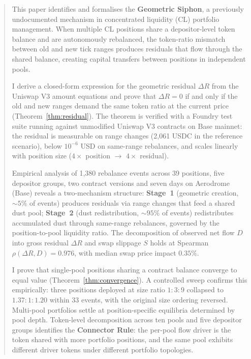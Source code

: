 \documentclass[11pt,a4paper]{article}
\begin{document}
\begin{abstract}
This paper identifies and formalises the \textbf{Geometric Siphon}, a previously undocumented mechanism in concentrated liquidity (CL) portfolio management. When multiple CL positions share a depositor-level token balance and are autonomously rebalanced, the token-ratio mismatch between old and new tick ranges produces residuals that flow through the shared balance, creating capital transfers between positions in independent pools.

I derive a closed-form expression for the geometric residual $\Delta R$ from the Uniswap V3 amount equations and prove that $\Delta R = 0$ if and only if the old and new ranges demand the same token ratio at the current price (Theorem~\ref{thm:residual}). The theorem is verified with a Foundry test suite running against unmodified Uniswap V3 contracts on Base mainnet: the residual is measurable on range changes (2{,}061 USDC in the reference scenario), below $10^{-6}$ USD on same-range rebalances, and scales linearly with position size ($4\times$ position $\to$ $4\times$ residual).

Empirical analysis of 1{,}380 rebalance events across 39 positions, five depositor groups, two contract versions and seven days on Aerodrome (Base) reveals a two-mechanism structure: \textbf{Stage~1} (geometric creation, ${\sim}5\%$ of events) produces residuals via range changes that feed a shared dust pool; \textbf{Stage~2} (dust redistribution, ${\sim}95\%$ of events) redistributes accumulated dust through same-range rebalances, governed by the position-to-pool liquidity ratio. The decomposition of observed net flow $D$ into gross residual $\Delta R$ and swap slippage $S$ holds at Spearman $\rho(\Delta R, D) = 0.976$, with median swap price impact $0.35\%$.

I prove that single-pool positions sharing a contract balance converge to equal value (Theorem~\ref{thm:convergence}). A controlled sweep confirms this empirically: three positions deployed at size ratio $1{:}3{:}9$ collapsed to $1.37{:}1{:}1.20$ within 33 events, with the original size ordering reversed. Multi-pool portfolios settle at position-specific equilibria determined by pool depth. Token-level decomposition across ten pools and five depositor groups identifies the \textbf{Connector Rule}: the per-pool flow driver is the token shared with more portfolio positions, and the same pool exhibits different driver tokens under different portfolio topologies.


\end{abstract}
\end{document}
